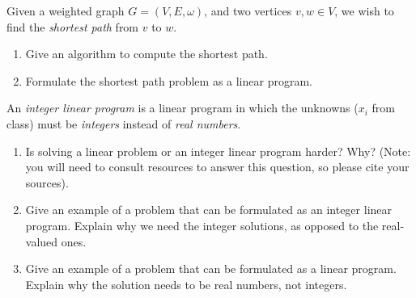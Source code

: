 \documentclass{article}
\begin{document}
\nextprob
Given a weighted graph $G=(V,E,\omega)$, and two vertices $v,w \in V$, we wish
to find the \emph{shortest path} from $v$ to $w$.

\begin{enumerate}
\item Give an algorithm to compute the shortest path.
\item Formulate the shortest path problem as a linear program.
\end{enumerate}

\nextprob
An \emph{integer linear program} is a linear program in which the unknowns
($x_i$ from class) must be \emph{integers} instead of \emph{real numbers}.

\begin{enumerate}
\item Is solving a linear problem or an integer linear program harder?  Why?
(Note: you will need to consult resources to answer this question, so
please cite your sources).
\item Give an example of a problem that can be formulated as an integer
linear program.  Explain why we need the integer solutions, as opposed
to the real-valued ones.
\item Give an example of a problem that can be formulated as a linear
program.  Explain why the solution needs to be real numbers, not integers.
\end{enumerate}
\end{document}
